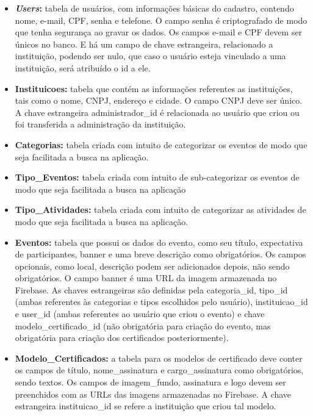 \begin{itemize}
    \item \textbf{\textit{Users}:} tabela de usuários, com informações básicas do cadastro, contendo nome, e-mail, CPF, senha e telefone. O campo senha é criptografado de modo que tenha segurança ao gravar os dados. Os campos e-mail e CPF devem ser únicos no banco. E há um campo de chave estrangeira, relacionado a instituição, podendo ser nulo, que caso o usuário esteja vinculado a uma instituição, será atribuído o id a ele.
    
    \item \textbf{Instituicoes:} tabela que contém as informações referentes as instituições, tais como o nome, CNPJ, endereço e cidade. O campo CNPJ deve ser único. A chave estrangeira administrador\_id é relacionada ao usuário que criou ou foi transferida a administração da instituição.
    
    \item \textbf{Categorias:} tabela criada com intuito de categorizar os eventos de modo que seja facilitada a busca na aplicação.
    
    \item \textbf{Tipo\_Eventos:} tabela criada com intuito de sub-categorizar os eventos de modo que seja facilitada a busca na aplicação
    
    \item \textbf{Tipo\_Atividades:} tabela criada com intuito de categorizar as atividades de modo que seja facilitada a busca na aplicação.
    
    \item \textbf{Eventos:} tabela que possui os dados do evento, como seu título, expectativa de participantes, banner e uma breve descrição como obrigatórios. Os campos opcionais, como local, descrição podem ser adicionados depois, não sendo obrigatórios. O campo banner é uma URL da imagem armazenada no Firebase. As chaves estrangeiras são definidas pela categoria\_id, tipo\_id (ambas referentes às categorias e tipos escolhidos pelo usuário), instituicao\_id e user\_id (ambas referentes ao usuário que criou o evento) e chave modelo\_certificado\_id (não obrigatória para criação do evento, mas obrigatória para criação dos certificados posteriormente).
    
    \item \textbf{Modelo\_Certificados:} a tabela para os modelos de certificado deve conter os campos de título, nome\_assinatura e cargo\_assinatura como obrigatórios, sendo textos. Os campos de imagem\_fundo, assinatura e logo devem ser preenchidos com as URLs das imagens armazenadas no Firebase. A chave estrangeira instituicao\_id se refere a instituição que criou tal modelo.
    

\end{itemize}

